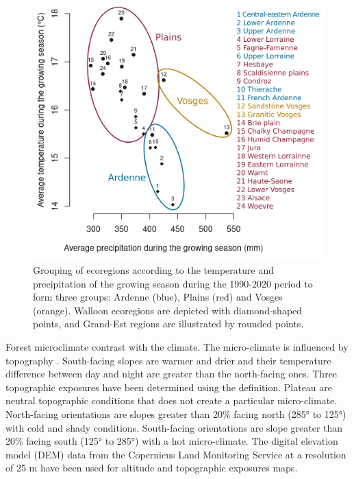\documentclass[3p,procedia]{elsarticle}
\begin{document}
\begin{figure}[htbp] 
	\centering
	\includegraphics[width=0.8\linewidth]{climat/climat_region.png}
	\caption{Grouping of ecoregions according to the temperature and precipitation of the growing season during the 1990-2020 period to form three groups: Ardenne (blue), Plains (red) and Vosges (orange). Walloon ecoregions are depicted with diamond-shaped points, and Grand-Est regions are illustrated by rounded points.}
	\label{fig:clim}
\end{figure}
Forest microclimate contrast with the climate.
The micro-climate is influenced by topography \citep{de_frenne_forest_2021}.
South-facing slopes are warmer and drier and their temperature difference between day and night are greater than the north-facing ones.
Three topographic exposures have been determined using the \cite{Delvaux_galoux} definition.
Plateau are neutral topographic conditions that does not create a particular micro-climate. 
North-facing orientations are slopes greater than  20\% facing north (285° to 125°) with cold and shady conditions.
South-facing orientations are slope greater than  20\% facing south (125° to 285°) with a hot micro-climate.
The digital elevation model (DEM) data from the Copernicus Land Monitoring Service \citep{DEM_copernicus} at a resolution of 25 m have been used for altitude and topographic exposures maps.
\end{document}
